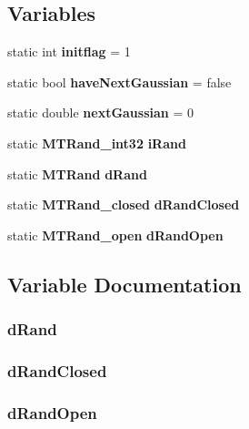 \subsection*{Variables}
\begin{CompactItemize}
\item 
static int {\bf initflag} = 1
\item 
static bool {\bf haveNextGaussian} = false
\item 
static double {\bf nextGaussian} = 0
\item 
static {\bf MTRand\_\-int32} {\bf iRand}
\item 
static {\bf MTRand} {\bf dRand}
\item 
static {\bf MTRand\_\-closed} {\bf dRandClosed}
\item 
static {\bf MTRand\_\-open} {\bf dRandOpen}
\end{CompactItemize}


\subsection{Variable Documentation}
\subsubsection{ {\bf dRand}\hspace{0.3cm}{\tt  [static]}}\label{random_8cpp_48bbb8eb31cbfd556092830a98231d03}


\subsubsection{ {\bf dRandClosed}\hspace{0.3cm}{\tt  [static]}}\label{random_8cpp_f661d70fb60f0f8bb9eab40d6a0bda30}


\subsubsection{ {\bf dRandOpen}\hspace{0.3cm}{\tt  [static]}}\label{random_8cpp_ca6e2c87601efbafd1a0dde621e0f38a}


